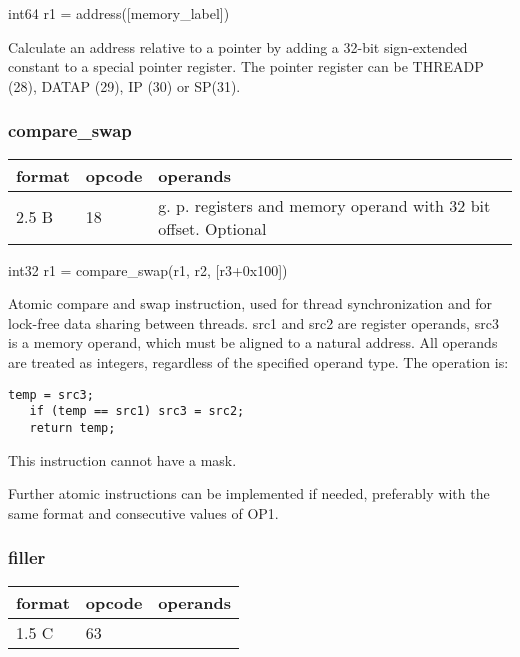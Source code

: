 \documentclass[forwardcom.tex]{subfiles}
\begin{document}
int64 r1 = address([memory\_label])
\vspace{2mm}

Calculate an address relative to a pointer by adding a 32-bit sign-extended constant to a special pointer register. The pointer register can be THREADP (28), DATAP (29), IP (30) or SP(31).
\vspace{2mm}

\subsubsection{compare\_swap}
\label{table:compareSwapInstruction}
\begin{tabular}{|p{12mm}|p{12mm}|p{110mm}|}
\hline
\bfseries format & \bfseries opcode & \bfseries operands \\ \hline
2.5 B & 18 & g. p. registers and memory operand with 32 bit offset. Optional \\ \hline
\end{tabular}
\vspace{2mm}

int32 r1 = compare\_swap(r1, r2, [r3+0x100])
\vspace{2mm}

Atomic compare and swap instruction, used for thread synchronization and for lock-free data sharing between threads. src1 and src2 are register operands, src3 is a memory operand, which must be aligned to a natural address. All operands are treated as integers, regardless of the specified operand type. The operation is:

\begin{lstlisting}[frame=none]
   temp = src3;
   if (temp == src1) src3 = src2;
   return temp;
\end{lstlisting}

This instruction cannot have a mask.
\vspace{2mm}

Further atomic instructions can be implemented if needed, preferably with the same format and consecutive values of OP1.

\subsubsection{filler}
\label{table:fillerInstruction}
\begin{tabular}{|p{12mm}|p{12mm}|p{110mm}|}
\hline
\bfseries format & \bfseries opcode & \bfseries operands \\ \hline
1.5 C & 63 & \\ \hline
\end{tabular}
\vspace{2mm}
\end{document}
